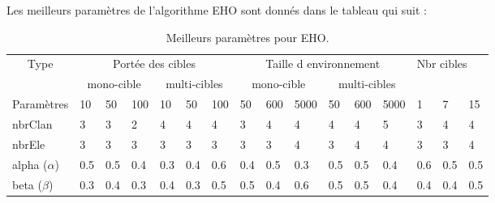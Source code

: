 	Les meilleurs paramètres de l'algorithme EHO sont donnés dans le tableau qui suit :
	\begin{table}[h]
		\begin{tabular}{|l|p{0.3cm}|p{0.3cm}|p{0.3cm}|p{0.3cm}|p{0.3cm}|p{0.3cm}|p{0.5cm}|p{0.5cm}|p{0.6cm}|p{0.5cm}|p{0.5cm}|p{0.6cm}|p{0.4cm}|p{0.4cm}|p{0.4cm}|}
			\hline
			\multicolumn{1}{|c|}{\multirow{2}{*}{Type}} & \multicolumn{6}{c|}{Portée des cibles}                              & \multicolumn{6}{c|}{Taille d environnement}                         & \multicolumn{3}{l|}{\multirow{2}{*}{Nbr cibles}} \\ \cline{2-13}
			\multicolumn{1}{|c|}{}                      & \multicolumn{3}{c|}{mono-cible} & \multicolumn{3}{c|}{multi-cibles} & \multicolumn{3}{c|}{mono-cible} & \multicolumn{3}{c|}{multi-cibles} & \multicolumn{3}{l|}{}                                  \\ \hline
			\multicolumn{1}{|c|}{Paramètres}            & 10        & 50       & 100      & 10         & 50        & 100      & 50        & 600      & 5000     & 50        & 600       & 5000      & 1                & 7                & 15               \\ \hline \hline
			nbrClan                                     & 3         & 3        & 2        & 4          & 4         & 4        & 3         & 4        & 4        & 4         & 4         & 5         & 3                & 4                & 4                \\ \hline
			nbrEle                                      & 3         & 3        & 3        & 3          & 3         & 3        & 3         & 3        & 4        & 3         & 4         & 4         & 3                & 3                & 4                \\ \hline
			alpha ($\alpha$)                            & 0.5       & 0.5      & 0.4      & 0.3        & 0.4       & 0.6      & 0.4       & 0.5      & 0.3      & 0.5       & 0.5       & 0.4       & 0.6              & 0.5              & 0.5              \\ \hline
			beta ($\beta$)                              & 0.3       & 0.4      & 0.3      & 0.4        & 0.3       & 0.5      & 0.5       & 0.4      & 0.6      & 0.5       & 0.5       & 0.4       & 0.4              & 0.4              & 0.5              \\ \hline
		\end{tabular}
		\caption{Meilleurs paramètres pour EHO.}
	\end{table}
	
